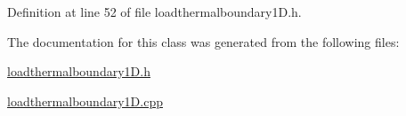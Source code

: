 Definition at line 52 of file loadthermalboundary1\+D.\+h.



The documentation for this class was generated from the following files\+:\begin{DoxyCompactItemize}
\item 
\hyperlink{loadthermalboundary1_d_8h}{loadthermalboundary1\+D.\+h}\item 
\hyperlink{loadthermalboundary1_d_8cpp}{loadthermalboundary1\+D.\+cpp}\end{DoxyCompactItemize}
